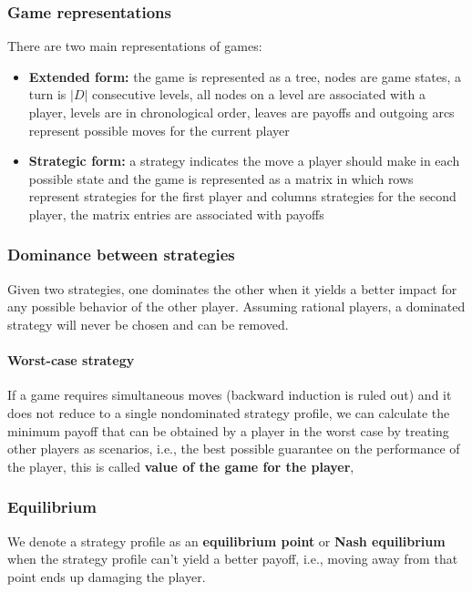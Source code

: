 \subsubsection{Game representations}

There are two main representations of games: 
\begin{itemize}
	\item \textbf{Extended form:} the game is represented as a tree, nodes are game states, a turn is $|D|$ consecutive levels, all nodes on a level are associated with a player, levels are in chronological order, leaves are payoffs and outgoing arcs represent possible moves for the current player
	
	\item \textbf{Strategic form:} a strategy indicates the move a player should make in each possible state and the game is represented as a matrix in which rows represent strategies for the first player and columns strategies for the second player, the matrix entries are associated with payoffs
\end{itemize}

\subsubsection{Dominance between strategies}

Given two strategies, one dominates the other when it yields a better impact for any possible behavior of the other player. Assuming rational players, a dominated strategy will never be chosen and can be removed.

\paragraph{Worst-case strategy} If a game requires simultaneous moves (backward induction is ruled out) and it does not reduce to a single nondominated strategy profile, we can calculate the minimum payoff that can be obtained by a player in the worst case by treating other players as scenarios, i.e., the best possible guarantee on the performance of the player, this is called \textbf{value of the game for the player},

\subsubsection{Equilibrium}

We denote a strategy profile as an \textbf{equilibrium point} or \textbf{Nash equilibrium} when the strategy profile can't yield a better payoff, i.e., moving away from that point ends up damaging the player.

